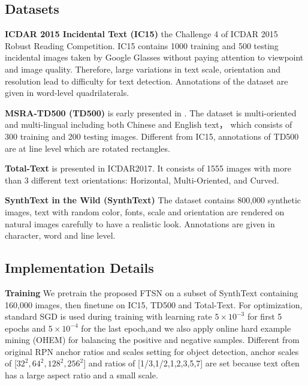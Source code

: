 \documentclass[a4paper,conference]{IEEEtran}
\begin{document}
\subsection{Datasets}
\textbf{ICDAR 2015 Incidental Text (IC15)} the Challenge 4 of ICDAR 2015 Robust
Reading Competition\cite{Karatzas2015ICDAR}. IC15 contains 1000 training and 500 testing incidental images taken by Google Glasses without paying attention to viewpoint and image quality. Therefore, large variations in text scale, orientation and resolution lead to difficulty for text detection. Annotations of the dataset are given in word-level
quadrilaterals.

\textbf{MSRA-TD500 (TD500)} is early presented in \cite{yao2012detecting}. The dataset is multi-oriented and multi-lingual including both Chinese and English text， which consists of 300 training and 200 testing images. Different from IC15, annotations of TD500 are at line level which are rotated rectangles.

\textbf{Total-Text} is presented in ICDAR2017\cite{CK2017}. It consists of 1555 images with more than 3 different text orientations: Horizontal, Multi-Oriented, and Curved.

\textbf{SynthText in the Wild (SynthText)} The dataset contains 800,000 synthetic images\cite{Gupta2016Synthetic}, text with random color, fonts, scale and orientation are rendered on natural images carefully to have a realistic look. Annotations are given in character, word and line level. 

\subsection{Implementation Details}
\textbf{Training} We pretrain the proposed FTSN on a subset of SynthText containing 160,000 images, then finetune on IC15, TD500 and Total-Text. For optimization, standard SGD is used during training with learning rate \begin{math}5\times10^{-3}\end{math} for first 5 epochs and \begin{math}5\times10^{-4}\end{math} for the last epoch,and we also apply online  hard  example  mining (OHEM)\cite{shrivastava2016training} for balancing the positive and negative samples. Different from original RPN anchor ratios and scales setting for object detection, anchor scales of [\begin{math}32^{2},64^{2},128^{2},256^{2}\end{math}] and ratios of [1/3,1/2,1,2,3,5,7] are set because text often has a large aspect ratio and a small scale\cite{Liao2016TextBoxes}.
\end{document}
